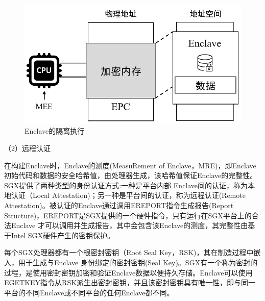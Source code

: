 \begin{figure}[h]
	\centering
	\includegraphics[width=0.6\linewidth]{figures/sep_exe.png}
	\caption{Enclave的隔离执行}
	\label{Sep_Exe}
\end{figure}

（2）远程认证

在构建Enclave时，Enclave的测度(MeasuRement of Enclave，MRE)，即Enclave初始代码和数据的安全哈希值，由处理器生成，该哈希值保证Enclave的完整性。SGX提供了两种类型的身份认证方式:一种是平台内部 Enclave间的认证，称为本地认证（Local Attestation)；另一种是平台间的认证，称为远程认证(Remote Attestation)。被认证的Enclave通过调用EREPORT指令生成报告(Report Structure)，EREPORT是SGX提供的一个硬件指令，只有运行在SGX平台上的合法Enclave 才可以调用并生成报告，其中会包含该Enclave的测度，其完整性由基于Intel SGX硬件产生的密钥保护。


每个SGX处理器都有一个根密封密钥（Root Seal Key，RSK)，其在制造过程中嵌入，用于生成与Enclave 身份绑定的密封密钥(Seal Key)。SGX有一个称为密封的过程，是使用密封密钥加密和验证Enclave数据以便持久存储。Enclave可以使用EGETKEY指令从RSK派生出密封密钥，并且该密封密钥具有唯一性，即与同一平台的不同Enclave或不同平台的任何Enclave都不同。



%
